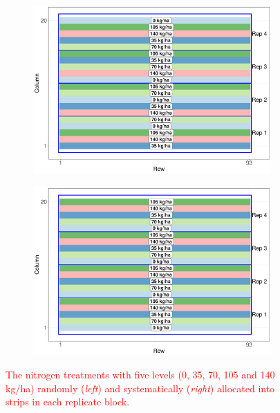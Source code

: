 \documentclass[a4paper]{article} 	%
\newcommand{\revision}[1]{\textcolor{red}{#1}}
\begin{document}
\begin{figure}[!htp]
	\begin{subfigure}[t]{0.45\textwidth}
		\centering
		\includegraphics[width=\linewidth]{Expt/Col_RandNitro_V4.pdf}
	\end{subfigure}
	\hspace{0.05\textwidth}
	\begin{subfigure}[t]{0.45\textwidth}
		\centering
		\includegraphics[width=\linewidth]{Expt/Col_SystNitro_V4.pdf}
	\end{subfigure}
	\caption{\revision{The nitrogen treatments with five levels (0, 35, 70, 105 and 140 kg/ha) randomly (\textit{left}) and systematically (\textit{right}) allocated into strips in each replicate block.}}\label{fig:Nitrogen}
\end{figure}
\end{document}
